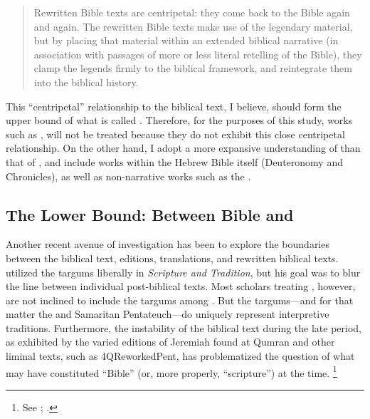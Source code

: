 \begin{quote}
    Rewritten Bible texts are centripetal: they come back to the Bible again and again. The rewritten Bible texts make use of the legendary material, but by placing that material within an extended biblical narrative (in association with passages of more or less literal retelling of the Bible), they clamp the legends firmly to the biblical framework, and reintegrate them into the biblical history.%
    \autocite[117]{alexander_carson-williamson1988}
\end{quote} 

This ``centripetal'' relationship to the biblical text, I believe, should form the upper bound of what is called \rwb. Therefore, for the purposes of this study, works such as \firstenoch, will not be treated because they do not exhibit this close centripetal relationship. On the other hand, I adopt a more expansive understanding of \rwb than that of \vermes, and include works within the Hebrew Bible itself (Deuteronomy and Chronicles), as well as non-narrative works such as the \templescroll.

\subsection{The Lower Bound: Between Bible and \rwb}

Another recent avenue of investigation has been to explore the boundaries between the biblical text, editions, translations, and rewritten biblical texts. \vermes utilized the targums liberally in \emph{Scripture and Tradition}, but his goal was to blur the line between individual post-biblical texts. Most scholars treating \rwb, however, are not inclined to include the targums among \rwb. But the targums---and for that matter the \lxx and Samaritan Pentateuch---do uniquely represent interpretive traditions. Furthermore, the instability of the biblical text during the late \secondtemple period, as exhibited by the varied editions of Jeremiah found at Qumran and other liminal texts, such as 4QReworkedPent, has problematized the question of what may have constituted ``Bible'' (or, more properly, ``scripture'') at the time.%
    \footnote{%
        See \cite[229--243]{zahn2011}; \cite{zahn_dsd2008}.}

